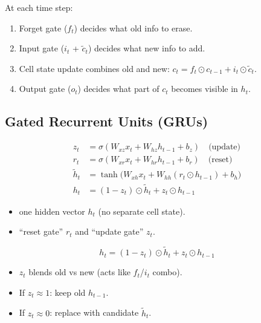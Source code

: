 \documentclass[
]{article}
\providecommand{\tightlist}{%
  \setlength{\itemsep}{0pt}\setlength{\parskip}{0pt}}
\begin{document}
At each time step:

\begin{enumerate}
\def\labelenumi{\arabic{enumi}.}
\tightlist
\item
  Forget gate (\(f_t\)) decides what old info to erase.\\
\item
  Input gate (\(i_t\) + \(\tilde{c}_t\)) decides what new info to add.\\
\item
  Cell state update combines old and new:
  \(c_t = f_t \odot c_{t-1} + i_t \odot \tilde{c}_t\).
\item
  Output gate (\(o_t\)) decides what part of \(c_t\) becomes visible in
  \(h_t\).
\end{enumerate}

\subsection{Gated Recurrent Units
(GRUs)}\label{gated-recurrent-units-grus}

\[
\begin{aligned}
z_t &= \sigma(W_{xz}x_t + W_{hz}h_{t-1} + b_z) \quad\text{(update)}\\
r_t &= \sigma(W_{xr}x_t + W_{hr}h_{t-1} + b_r) \quad\text{(reset)}\\
\tilde{h}_t &= \tanh\big(W_{xh}x_t + W_{hh}(r_t \odot h_{t-1}) + b_h\big) \\
h_t &= (1 - z_t)\odot \tilde{h}_t + z_t \odot h_{t-1}
\end{aligned}
\]

\begin{itemize}
\tightlist
\item
  one hidden vector \(h_t\) (no separate cell state).\\
\item
  ``reset gate'' \(r_t\) and ``update gate'' \(z_t\).
\end{itemize}

\[h_t = (1 - z_t)\odot \tilde{h}_t + z_t \odot h_{t-1}\]

\begin{itemize}
\tightlist
\item
  \(z_t\) blends old vs new (acts like \(f_t\)/\(i_t\) combo).
\item
  If \(z_t \approx 1\): keep old \(h_{t-1}\).\\
\item
  If \(z_t \approx 0\): replace with candidate \(\tilde{h}_t\).
\end{itemize}
\end{document}

